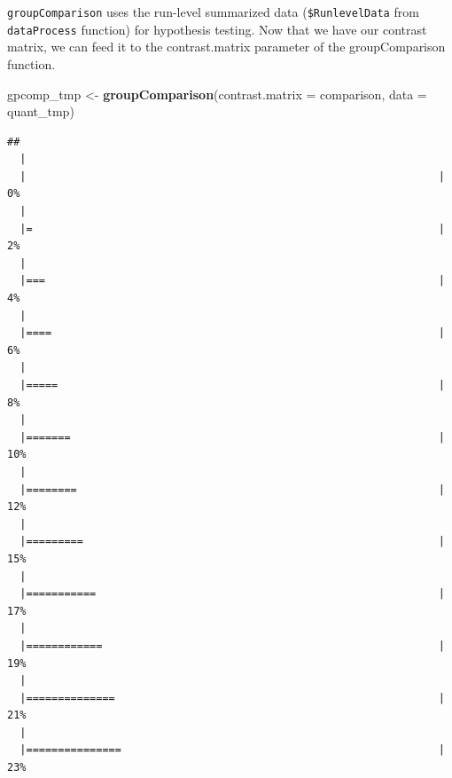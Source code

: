 \documentclass[]{book}
\newenvironment{Shaded}{\begin{snugshade}}{\end{snugshade}}
\newcommand{\DataTypeTok}[1]{\textcolor[rgb]{0.13,0.29,0.53}{#1}}
\newcommand{\KeywordTok}[1]{\textcolor[rgb]{0.13,0.29,0.53}{\textbf{#1}}}
\newcommand{\NormalTok}[1]{#1}
\newcommand{\StringTok}[1]{\textcolor[rgb]{0.31,0.60,0.02}{#1}}
\begin{document}
\texttt{groupComparison} uses the run-level summarized data (\texttt{\$RunlevelData} from \texttt{dataProcess} function) for hypothesis testing. Now that we have our contrast matrix, we can feed it to the contrast.matrix parameter of the groupComparison function.

\begin{Shaded}
\begin{Highlighting}[]
\NormalTok{gpcomp_tmp <-}\StringTok{ }\KeywordTok{groupComparison}\NormalTok{(}\DataTypeTok{contrast.matrix =}\NormalTok{ comparison, }\DataTypeTok{data =}\NormalTok{ quant_tmp)}
\end{Highlighting}
\end{Shaded}

\begin{verbatim}
## 
  |                                                                       
  |                                                                 |   0%
  |                                                                       
  |=                                                                |   2%
  |                                                                       
  |===                                                              |   4%
  |                                                                       
  |====                                                             |   6%
  |                                                                       
  |=====                                                            |   8%
  |                                                                       
  |=======                                                          |  10%
  |                                                                       
  |========                                                         |  12%
  |                                                                       
  |=========                                                        |  15%
  |                                                                       
  |===========                                                      |  17%
  |                                                                       
  |============                                                     |  19%
  |                                                                       
  |==============                                                   |  21%
  |                                                                       
  |===============                                                  |  23%

\end{verbatim}
\end{document}

